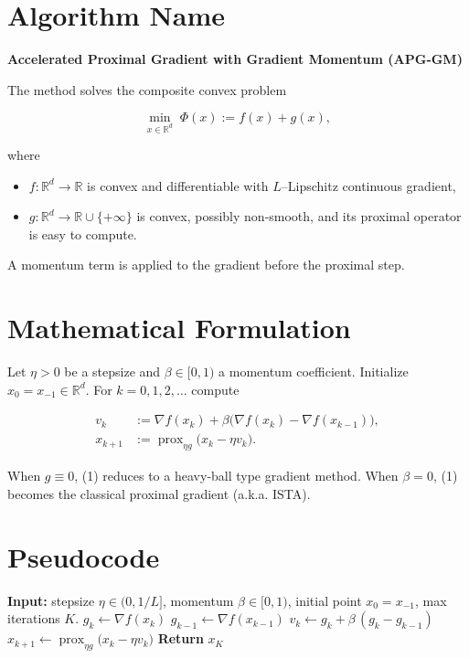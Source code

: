 \documentclass{article}
\newcommand{\prox}{\operatorname{prox}}
\begin{document}
\section*{Algorithm Name}
\textbf{Accelerated Proximal Gradient with Gradient Momentum (APG‑GM)}  

The method solves the composite convex problem  

\[
\min_{x\in\mathbb{R}^d}\; \Phi(x):=f(x)+g(x),
\]

where  
\begin{itemize}
  \item $f:\mathbb{R}^d\to\mathbb{R}$ is convex and differentiable with $L$–Lipschitz continuous gradient,
  \item $g:\mathbb{R}^d\to\mathbb{R}\cup\{+\infty\}$ is convex, possibly non‑smooth, and its proximal operator is easy to compute.
\end{itemize}
A momentum term is applied to the gradient before the proximal step.

\section*{Mathematical Formulation}
Let $\eta>0$ be a stepsize and $\beta\in[0,1)$ a momentum coefficient.  
Initialize $x_{0}=x_{-1}\in\mathbb{R}^{d}$. For $k=0,1,2,\dots$ compute  

\[
\boxed{
\begin{aligned}
v_{k} &:= \nabla f(x_{k})+\beta\bigl(\nabla f(x_{k})-\nabla f(x_{k-1})\bigr), \\[4pt]
x_{k+1} &:= \prox_{\eta g}\!\bigl(x_{k}-\eta v_{k}\bigr).
\end{aligned}}
\tag{1}
\]

When $g\equiv0$, (1) reduces to a heavy‑ball type gradient method.  
When $\beta=0$, (1) becomes the classical proximal gradient (a.k.a. ISTA).

\section*{Pseudocode}
\begin{algorithm}[H]
\caption{APG‑GM}
\begin{algorithmic}[1]
\State \textbf{Input:} stepsize $\eta\in(0,1/L]$, momentum $\beta\in[0,1)$, initial point $x_{0}=x_{-1}$, max iterations $K$.
    \State $g_{k}\gets \nabla f(x_{k})$                               
    \State $g_{k-1}\gets \nabla f(x_{k-1})$   
    \State $v_{k}\gets g_{k}+\beta\,(g_{k}-g_{k-1})$                
    \State $x_{k+1}\gets \prox_{\eta g}\bigl(x_{k}-\eta v_{k}\bigr)$ 
\EndFor
\State \textbf{Return} $x_{K}$
\end{algorithmic}
\end{algorithm}
\end{document}
